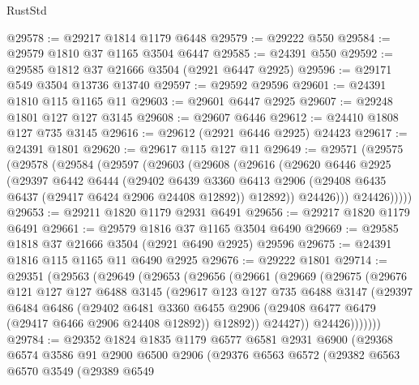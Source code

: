 \begin{lexlean}{RustStd}
\begin{coremodule}
@29578 := @29217 @1814 @1179 @6448
@29579 := @29222 @550
@29584 := @29579 @1810 @37 @1165 @3504 @6447
@29585 := @24391 @550
@29592 := @29585 @1812 @37 @21666 @3504 (@2921 @6447 @2925)
@29596 := @29171 @549 @3504 @13736 @13740
@29597 := @29592 @29596
@29601 := @24391 @1810 @115 @1165 @11
@29603 := @29601 @6447 @2925
@29607 := @29248 @1801 @127 @127 @3145
@29608 := @29607 @6446
@29612 := @24410 @1808 @127 @735 @3145
@29616 := @29612 (@2921 @6446 @2925) @24423
@29617 := @24391 @1801
@29620 := @29617 @115 @127 @11
@29649 := @29571
    (@29575
      (@29578
        (@29584
          (@29597
            (@29603
              (@29608
                (@29616
                  (@29620
                    @6446
                    @2925
                    (@29397
                      @6442
                      @6444
                      (@29402
                        @6439
                        @3360
                        @6413
                        @2906
                        (@29408 @6435 @6437 (@29417 @6424 @2906 @24408 @12892))
                        @12892))
                    @24426)))
              @24426)))))
@29653 := @29211 @1820 @1179 @2931 @6491
@29656 := @29217 @1820 @1179 @6491
@29661 := @29579 @1816 @37 @1165 @3504 @6490
@29669 := @29585 @1818 @37 @21666 @3504 (@2921 @6490 @2925) @29596
@29675 := @24391 @1816 @115 @1165 @11 @6490 @2925
@29676 := @29222 @1801
@29714 := @29351
    (@29563
      (@29649
        (@29653
          (@29656
            (@29661
              (@29669
                (@29675
                  (@29676
                    @121
                    @127
                    @127
                    @6488
                    @3145
                    (@29617
                      @123
                      @127
                      @735
                      @6488
                      @3147
                      (@29397
                        @6484
                        @6486
                        (@29402
                          @6481
                          @3360
                          @6455
                          @2906
                          (@29408 @6477 @6479 (@29417 @6466 @2906 @24408 @12892))
                          @12892))
                      @24427))
                  @24426)))))))
@29784 := @29352
    @1824
    @1835
    @1179
    @6577
    @6581
    @2931
    @6900
    (@29368
      @6574
      @3586
      @91
      @2900
      @6500
      @2906
      (@29376
        @6563
        @6572
        (@29382
          @6563
          @6570
          @3549
          (@29389
            @6549

\end{coremodule}
\end{lexlean}
